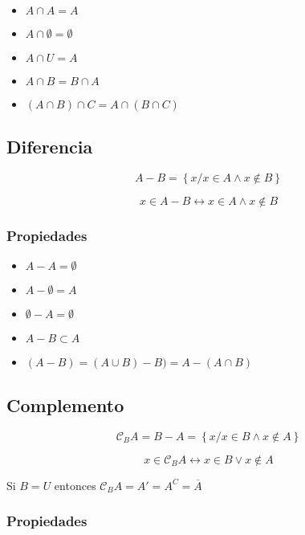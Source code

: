 \documentclass[
  16pt,
]{krantz}
\providecommand{\tightlist}{%
  \setlength{\itemsep}{0pt}\setlength{\parskip}{0pt}}
\theoremstyle{definition}
\theoremstyle{definition}
\theoremstyle{definition}
\theoremstyle{definition}
\theoremstyle{remark}
\begin{document}
\begin{itemize}
\tightlist
\item
  \(A\cap A=A\)
\item
  \(A\cap \emptyset=\emptyset\)
\item
  \(A\cap U=A\)
\item
  \(A\cap B=B\cap A\)
\item
  \((A\cap B)\cap C=A\cap(B\cap C)\)
\end{itemize}

\hypertarget{diferencia}{%
\subsection{Diferencia}\label{diferencia}}

\[
A- B=\left\{x/x\in A\wedge x\notin B\right\}
\]

\[
x\in A- B\leftrightarrow x\in A\wedge x\notin B
\]

\hypertarget{propiedades-5}{%
\subsubsection{Propiedades}\label{propiedades-5}}

\begin{itemize}
\tightlist
\item
  \(A- A=\emptyset\)
\item
  \(A- \emptyset=A\)
\item
  \(\emptyset-A=\emptyset\)
\item
  \(A- B\subset A\)
\item
  \((A-B)=(A\cup B)-B)=A-(A\cap B)\)
\end{itemize}

\hypertarget{complemento}{%
\subsection{Complemento}\label{complemento}}

\[
\mathcal{C}_BA=B-A=\left\{x/x\in B\wedge x\notin A\right\}
\]

\[
x\in \mathcal{C}_BA\leftrightarrow x\in B\vee x\notin A
\]

Si \(B=U\) entonces \(\mathcal{C}_BA=A'=A^C=\overline{A}\)

\hypertarget{propiedades-6}{%
\subsubsection{Propiedades}\label{propiedades-6}}
\end{document}
